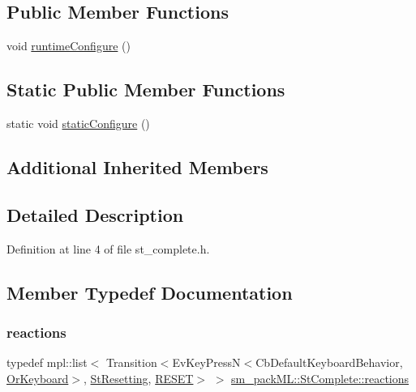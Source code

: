 \subsection*{Public Member Functions}
\begin{DoxyCompactItemize}
\item 
void \hyperlink{structsm__packML_1_1StComplete_aa499430406fce4eac712ca5a47f28027}{runtime\+Configure} ()
\end{DoxyCompactItemize}
\subsection*{Static Public Member Functions}
\begin{DoxyCompactItemize}
\item 
static void \hyperlink{structsm__packML_1_1StComplete_a800b03ade903de294f66fc2874bba57b}{static\+Configure} ()
\end{DoxyCompactItemize}
\subsection*{Additional Inherited Members}


\subsection{Detailed Description}


Definition at line 4 of file st\+\_\+complete.\+h.



\subsection{Member Typedef Documentation}
\mbox{\label{structsm__packML_1_1StComplete_a37887e4ae44b8c4c4d6081fe95b52bdc}} 
\subsubsection{\texorpdfstring{reactions}{reactions}}
{\footnotesize\ttfamily typedef mpl\+::list$<$ Transition$<$Ev\+Key\+PressN$<$Cb\+Default\+Keyboard\+Behavior, \hyperlink{classsm__packML_1_1OrKeyboard}{Or\+Keyboard}$>$, \hyperlink{structsm__packML_1_1StResetting}{St\+Resetting}, \hyperlink{structsm__packML_1_1StComplete_1_1RESET}{R\+E\+S\+ET}$>$ $>$ \hyperlink{structsm__packML_1_1StComplete_a37887e4ae44b8c4c4d6081fe95b52bdc}{sm\+\_\+pack\+M\+L\+::\+St\+Complete\+::reactions}}



